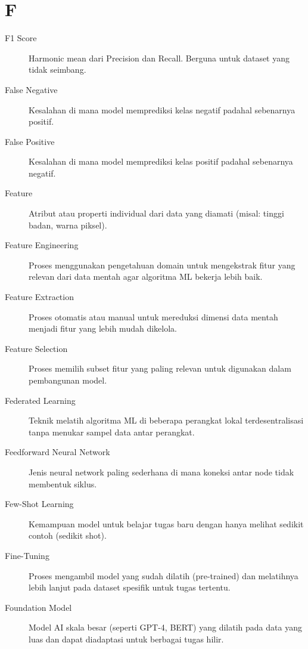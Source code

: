 \section*{F}
\begin{description}
    \item[F1 Score] Harmonic mean dari Precision dan Recall. Berguna untuk dataset yang tidak seimbang.
    \item[False Negative] Kesalahan di mana model memprediksi kelas negatif padahal sebenarnya positif.
    \item[False Positive] Kesalahan di mana model memprediksi kelas positif padahal sebenarnya negatif.
    \item[Feature] Atribut atau properti individual dari data yang diamati (misal: tinggi badan, warna piksel).
    \item[Feature Engineering] Proses menggunakan pengetahuan domain untuk mengekstrak fitur yang relevan dari data mentah agar algoritma ML bekerja lebih baik.
    \item[Feature Extraction] Proses otomatis atau manual untuk mereduksi dimensi data mentah menjadi fitur yang lebih mudah dikelola.
    \item[Feature Selection] Proses memilih subset fitur yang paling relevan untuk digunakan dalam pembangunan model.
    \item[Federated Learning] Teknik melatih algoritma ML di beberapa perangkat lokal terdesentralisasi tanpa menukar sampel data antar perangkat.
    \item[Feedforward Neural Network] Jenis neural network paling sederhana di mana koneksi antar node tidak membentuk siklus.
    \item[Few-Shot Learning] Kemampuan model untuk belajar tugas baru dengan hanya melihat sedikit contoh (sedikit shot).
    \item[Fine-Tuning] Proses mengambil model yang sudah dilatih (pre-trained) dan melatihnya lebih lanjut pada dataset spesifik untuk tugas tertentu.
    \item[Foundation Model] Model AI skala besar (seperti GPT-4, BERT) yang dilatih pada data yang luas dan dapat diadaptasi untuk berbagai tugas hilir.
\end{description}

